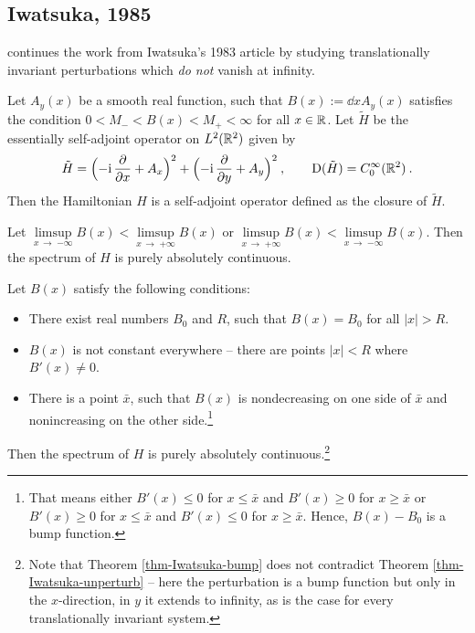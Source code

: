 \subsection{Iwatsuka, 1985}
\cite{Iwatsuka1985} continues the work from Iwatsuka's 1983 article by studying translationally invariant perturbations which \textit{do not} vanish at infinity.
\begin{defn}[Hamiltonian]
    Let $A_y(x)$ be a smooth real function, such that $B(x) := \dd{}{x} A_y(x)$ satisfies the condition $0 < M_- < B(x) < M_+ < \infty$ for all $x \in \mathbb{R}$. Let $\tilde H$ be the essentially self-adjoint operator on $L^2(\mathbb{R}^2)$ given by
    \begin{gather*}
        \tilde H
        = \Big( {-\mathrm{i}} \, \frac{\partial }{\partial x} + A_x \Big)^2
        + \Big( {-\mathrm{i}} \, \frac{\partial }{\partial y} + A_y \Big)^2
        \: , \qquad
        \mathrm{D}(\tilde H) = C_0^\infty(\mathbb{R}^2)
        \: .
    \end{gather*}
    Then the Hamiltonian $H$ is a self-adjoint operator defined as the closure of $\tilde H$.
\end{defn}
\begin{thm}
    Let $\underset{x \, \to \; {-\infty}}{\operatorname{\lim\sup}} B(x) < \underset{x \, \to \; {+\infty}}{\operatorname{\lim\sup}} B(x)$ or $\underset{x \, \to \; {+\infty}}{\operatorname{\lim\sup}} B(x) < \underset{x \, \to \; {-\infty}}{\operatorname{\lim\sup}} B(x)$. Then the spectrum of $H$ is purely absolutely continuous.
\end{thm}
\begin{thm} \label{thm-Iwatsuka-bump}
    Let $B(x)$ satisfy the following conditions:
    \begin{itemize}
        \item There exist real numbers $B_0$ and $R$, such that $B(x) = B_0$ for all $|x| > R$.
        \item $B(x)$ is not constant everywhere – there are points $|x| \!<\! R$ where $B'(x) \!\neq\! 0$.
        \item There is a point $\bar x$, such that $B(x)$ is nondecreasing on one side of $\bar x$ and nonincreasing on the other side.\footnote{That means either $B'(x)\leq 0$ for $x\leq\bar x$ and $B'(x) \geq 0$ for $x\geq\bar x$ or $B'(x)\geq 0$ for $x\leq\bar x$ and $B'(x) \leq 0$ for $x\geq\bar x$. Hence, $B(x) - B_0$ is a bump function.}
    \end{itemize}
    Then the spectrum of $H$ is purely absolutely continuous.\footnote{Note that Theorem \ref{thm-Iwatsuka-bump} does not contradict Theorem \ref{thm-Iwatsuka-unperturb} – here the perturbation is a bump function but only in the $x$-direction, in $y$ it extends to infinity, as is the case for every translationally invariant system.}
\end{thm}

